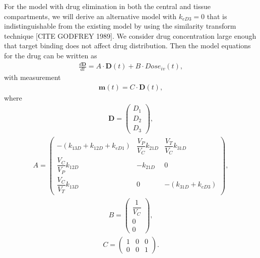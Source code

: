 For the model with drug elimination in both the central and tissue compartments, we will derive an alternative model with $k_{eD3} = 0$ that is indistinguishable from the existing model by using the similarity transform technique [CITE GODFREY 1989]. We consider drug concentration large enough that target binding does not affect drug distribution. Then the model equations for the drug can be written as 
\begin{align}
\frac{d\mathbf{D}}{dt} = A \cdot \mathbf{D}(t) + B \cdot Dose_{iv}(t), \label{model matrix}
\end{align}
with measurement
\begin{align}
\mathbf{m}(t) = C \cdot \mathbf{D}(t), \label{measurement matrix}
\end{align}
where
\begin{align}
\mathbf{D} = \begin{pmatrix}
D_1 \\
D_2 \\
D_3
\end{pmatrix},
\end{align}
\begin{align}
A = \begin{pmatrix}
-(k_{13D} + k_{12D} + k_{eD1}) & \dfrac{V_P}{V_C}k_{21D} & \dfrac{V_T}{V_C}k_{31D} \\
\dfrac{V_C}{V_P}k_{12D}        & -k_{21D}                & 0 \\
\dfrac{V_C}{V_T}k_{13D}        & 0                       & -(k_{31D} + k_{eD3})
\end{pmatrix},
\end{align}
\begin{align}
B = \begin{pmatrix}
\dfrac{1}{V_C} \\
0 \\
0
\end{pmatrix},
\end{align}
\begin{align}
C = \begin{pmatrix}
1 & 0 & 0 \\
0 & 0 & 1 
\end{pmatrix}.
\end{align}

